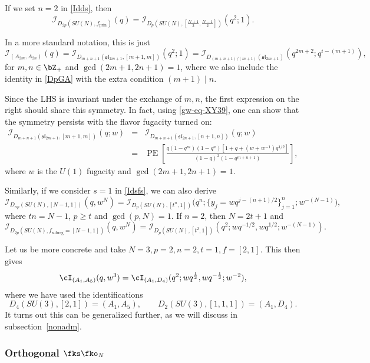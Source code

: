 \documentclass[a4paper,11pt]{article}
\theoremstyle{definition}
\theoremstyle{definition}
\theoremstyle{remark}
\newcommand{\prin}{ \text{prin}}
\newcommand{\be}{\begin{equation}}
\newcommand{\ee}{\end{equation}}
\newcommand{\beqn}{\begin{eqnarray}}
\newcommand{\eeqn}{\end{eqnarray}}
\begin{document}
 

If we set $n=2$ in \eqref{Idds}, then 
\be\label{prinsbu}
\mathcal{I}_{D_{2  p}(SU(N),f_\prin)}(q)
=\mathcal{I}_{D_{  p}(SU(N), [  \frac{N+1}{2}, \frac{N-1}{2} ])}(q^{ 2 }; 1).
\ee



In a more standard notation, this is just 
\be
\mathcal{I}_{(A_{2m}, A_{2n})}(q) = \mathcal{I}_{D_{m+n+1}(\mathfrak{sl}_{2m+1}, [m+1, m])}(q^2; 1)
= \mathcal{I}_{D_{(m+n+1)/(m+1)}(\mathfrak{sl}_{2m+1})}(q^{2m+2} ; q^{i-(m +1) }),
\ee
for $m,n\in \bZ_+$ and  $\gcd(2m+1,2n+1)=1$, where we also include the identity in \eqref{DpGA} with the extra condition   $ (m+1)\mid n$. 

 

%
Since the LHS is invariant under the exchange of $m,n$, the first expression
on the right should share this symmetry. In fact,  using \eqref{gw-eq-XY39}, one can show that the symmetry persists with the flavor
 fugacity turned on:   
 \beqn
\mathcal{I}_{D_{m+n+1}(\mathfrak{sl}_{2m+1}, [m+1, m])}(q ; w)
&=&\mathcal{I}_{D_{m+n+1}(\mathfrak{sl}_{2n+1}, [n+1, n])}(q ; w)
\\&=&
\operatorname{PE} \left[ \frac{q(1 - q^m)(1 - q^n) \left[ 1 + q + (w + w^{-1})q^{1/2} \right]}{(1 - q)^2(1 - q^{m+n+1})} \right],
\qquad\qquad
\eeqn 
where $w$ is the $U(1)$ fugacity and $\gcd(2m+1,2n+1)=1$.


Similarly, if we consider $s=1$ in \eqref{Idsfs}, we can also derive
 \be
 \mathcal I_{D_{np}(SU(N),[N-1,1])}(q,w^N)=\mathcal I_{D_p(SU(N),[t^n,1])}
\Big(q^n;\{y_j=wq^{j-(n+1)/2}\}_{j=1}^n;w^{-(N-1)}\Big),
 \ee  
 where $tn=N-1$,  $p\geq t$ and $\gcd(p,N)=1$.   If $n=2$, then  $N=2t+1$ and 
  \be
\mathcal{I}_{D_{ 2 p}(SU(N),f_\text {subreg}=[N-1,1])}(q,w^N)
=\mathcal{I}_{D_{  p}(SU(N), [  t  ^{  2 },  1 ])}(q^{ 2}; wq^{-1/2},wq^{1/2};w^{-(N-1)}).
\ee 




 
 

Let us be more concrete and take $N=3, p= 2, n=2,t=1, f=[2,1]$. This then gives
  \be\label{nonadmp2}
\cI_{(A_1,A_5)}(q, w^3)=\cI_{(A_1,D_4)}(q^2;w q^{\frac12},w q^{-\frac12};w  ^{-2}),
\ee  where we have used the identifications
\be
D_4(SU(3),[2,1])=(A_1,A_5),\qquad
D_2(SU(3),[1,1,1])=(A_1,D_4).
\ee
 It turns out this can be generalized further, as we will discuss in  subsection~\ref{nonadm}.
 

 

\subsubsection{Orthogonal   $\fks\fko_N$ }
 
\end{document}
